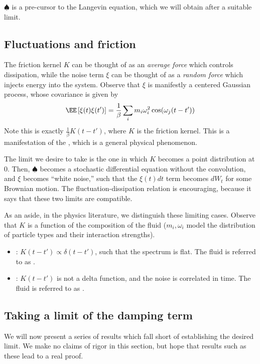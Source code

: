 \documentclass{scrartcl}
\begin{document}
$\spadesuit$ is a pre-cursor to the Langevin equation, which we will obtain after a suitable limit.

\subsection{Fluctuations and friction}
The friction kernel $K$ can be thought of as an \emph{average force} which controls dissipation, while the noise term $\xi$ can be thought of as a \emph{random force} which injects energy into the system. Observe that $\xi$ is manifestly a centered Gaussian process, whose covariance is given by
\[
    \EE\left[\xi(t) \xi(t')\right] = \frac{1}{\beta}\sum_i m_i \omega_i^2 \cos(\omega_j(t-t'))
\]
Note this is exactly $\frac{1}{\beta} K(t-t')$, where $K$ is the friction kernel. This is a manifestation of the , which is a general physical phenomenon.

The limit we desire to take is the one in which $K$ becomes a point distribution at $0$. Then, $\spadesuit$ becomes a stochastic differential equation without the convolution, and $\xi$ becomes ``white noise,'' such that the $\xi(t)dt$ term becomes $dW_t$ for some Brownian motion. The fluctuation-dissipation relation is encouraging, because it says that these two limits are compatible.

As an aside, in the physics literature, we distinguish these limiting cases. Observe that $K$ is a function of the composition of the fluid ($m_i, \omega_i$ model the distribution of particle types and their interaction strengths).
\begin{itemize}
    \item {}: $K(t - t')\propto \delta(t-t')$, such that the spectrum is flat. The fluid is referred to as . 
    \item {}: $K(t-t')$ is not a delta function, and the noise is correlated in time. The fluid is referred to as .
\end{itemize}

\subsection{Taking a limit of the damping term}

We will now present a series of results which fall short of establishing the desired limit. We make no claims of rigor in this section, but hope that results such as these lead to a real proof.
\end{document}
